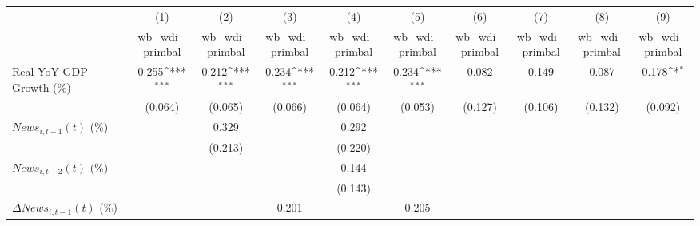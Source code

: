 {
\def\sym#1{\ifmmode^{#1}\else\(^{#1}\)\fi}
\begin{tabular}{l*{9}{c}}
\toprule
                    &\multicolumn{1}{c}{(1)}&\multicolumn{1}{c}{(2)}&\multicolumn{1}{c}{(3)}&\multicolumn{1}{c}{(4)}&\multicolumn{1}{c}{(5)}&\multicolumn{1}{c}{(6)}&\multicolumn{1}{c}{(7)}&\multicolumn{1}{c}{(8)}&\multicolumn{1}{c}{(9)}\\
                    &\multicolumn{1}{c}{wb_wdi_primbal}&\multicolumn{1}{c}{wb_wdi_primbal}&\multicolumn{1}{c}{wb_wdi_primbal}&\multicolumn{1}{c}{wb_wdi_primbal}&\multicolumn{1}{c}{wb_wdi_primbal}&\multicolumn{1}{c}{wb_wdi_primbal}&\multicolumn{1}{c}{wb_wdi_primbal}&\multicolumn{1}{c}{wb_wdi_primbal}&\multicolumn{1}{c}{wb_wdi_primbal}\\
\midrule
Real YoY GDP Growth (\%)&       0.255\sym{***}&       0.212\sym{***}&       0.234\sym{***}&       0.212\sym{***}&       0.234\sym{***}&       0.082         &       0.149         &       0.087         &       0.178\sym{*}  \\
                    &     (0.064)         &     (0.065)         &     (0.066)         &     (0.064)         &     (0.053)         &     (0.127)         &     (0.106)         &     (0.132)         &     (0.092)         \\
\addlinespace
$ News_{i,t-1}(t)$ (\%)&                     &       0.329         &                     &       0.292         &                     &                     &                     &                     &                     \\
                    &                     &     (0.213)         &                     &     (0.220)         &                     &                     &                     &                     &                     \\
\addlinespace
$ News_{i,t-2}(t)$ (\%)&                     &                     &                     &       0.144         &                     &                     &                     &                     &                     \\
                    &                     &                     &                     &     (0.143)         &                     &                     &                     &                     &                     \\
\addlinespace
$ \Delta News_{i,t-1}(t)$ (\%)&                     &                     &       0.201         &                     &       0.205         &                     &                     &                     &                     \\

\end{tabular}}
